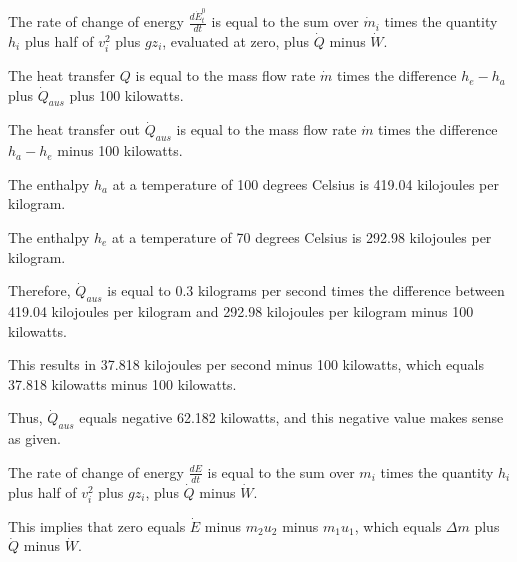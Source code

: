 The rate of change of energy \( \frac{d\dot{E}_t^0}{dt} \) is equal to the sum over \( \dot{m}_i \) times the quantity \( h_i \) plus half of \( v_i^2 \) plus \( g z_i \), evaluated at zero, plus \( \dot{Q} \) minus \( \dot{W} \).

The heat transfer \( Q \) is equal to the mass flow rate \( \dot{m} \) times the difference \( h_e - h_a \) plus \( \dot{Q}_{aus} \) plus 100 kilowatts.

The heat transfer out \( \dot{Q}_{aus} \) is equal to the mass flow rate \( \dot{m} \) times the difference \( h_a - h_e \) minus 100 kilowatts.

The enthalpy \( h_a \) at a temperature of 100 degrees Celsius is 419.04 kilojoules per kilogram.

The enthalpy \( h_e \) at a temperature of 70 degrees Celsius is 292.98 kilojoules per kilogram.

Therefore, \( \dot{Q}_{aus} \) is equal to 0.3 kilograms per second times the difference between 419.04 kilojoules per kilogram and 292.98 kilojoules per kilogram minus 100 kilowatts.

This results in 37.818 kilojoules per second minus 100 kilowatts, which equals 37.818 kilowatts minus 100 kilowatts.

Thus, \( \dot{Q}_{aus} \) equals negative 62.182 kilowatts, and this negative value makes sense as given.

The rate of change of energy \( \frac{dE}{dt} \) is equal to the sum over \( m_i \) times the quantity \( h_i \) plus half of \( v_i^2 \) plus \( g z_i \), plus \( \dot{Q} \) minus \( \dot{W} \).

This implies that zero equals \( \dot{E} \) minus \( m_2 u_2 \) minus \( m_1 u_1 \), which equals \( \Delta m \) plus \( \dot{Q} \) minus \( \dot{W} \).